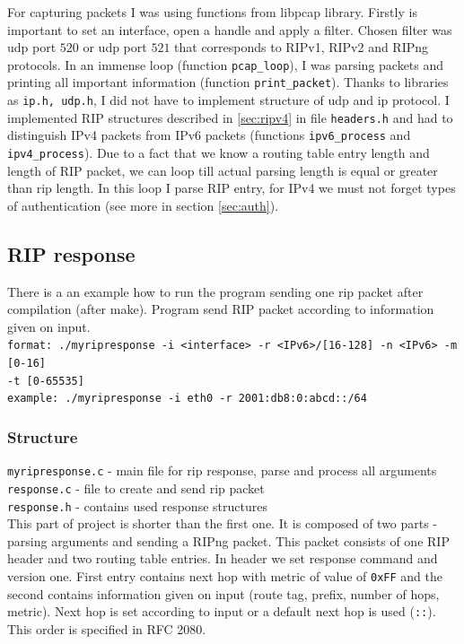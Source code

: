 \documentclass[11pt,a4paper]{article}
\begin{document}
\noindent
For capturing packets I was using functions from libpcap library. Firstly is important to set an interface, open a handle and apply a filter. Chosen filter was udp port $520$ or udp port $521$ that corresponds to RIPv1, RIPv2 and RIPng protocols. In an immense loop (function \texttt{pcap\_loop}), I was parsing packets and printing all important information (function \texttt{print\_packet}). Thanks to libraries as \texttt{ip.h, udp.h}, I did not have to implement structure of udp and ip protocol. I implemented RIP structures described in \ref{sec:ripv4} in file \texttt{headers.h} and had to distinguish IPv4 packets from IPv6 packets (functions \texttt{ipv6\_process} and \texttt{ipv4\_process}). Due to a fact that we know a routing table entry length and length of RIP packet, we can loop till actual parsing length is equal or greater than rip length. In this loop I parse RIP entry, for IPv4 we must not forget types of authentication (see more in section \ref{sec:auth}).

\subsection{RIP response}
There is a an example how to run the program sending one rip packet after compilation (after make). Program send RIP packet according to information given on input.\\

\noindent
\texttt{format: ./myripresponse -i <interface> -r <IPv6>/[16-128] {-n <IPv6>} {-m [0-16]} \\{-t [0-65535]}} \\
\texttt{example: ./myripresponse -i eth0 -r 2001:db8:0:abcd::/64 }\\

\subsubsection{Structure}
\texttt{myripresponse.c} - main file for rip response, parse and process all arguments\\
\texttt{response.c} - file to create and send rip packet\\
\texttt{response.h} - contains used response structures\\

\noindent
This part of project is shorter than the first one. It is composed of two parts - parsing arguments and sending a RIPng packet. This packet consists of one RIP header and two routing table entries. In header we set response command and version one. First entry contains next hop with metric of value of \texttt{0xFF}\cite{ripng} and the second contains information given on input (route tag, prefix, number of hops, metric). Next hop is set according to input or a default next hop is used (\texttt{::}). This order is specified in RFC 2080.\\
\end{document}
